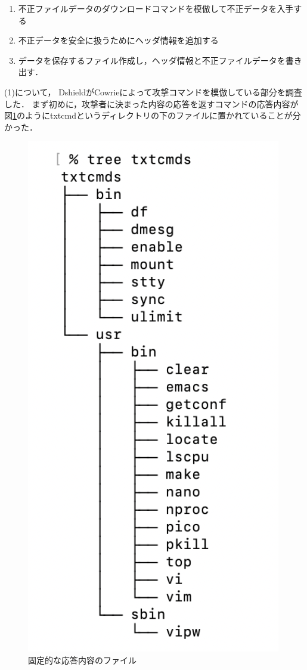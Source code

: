 \documentclass[dvipdfmx]{bta}
\begin{document}
\renewcommand{\labelenumi}{(\arabic{enumi})}
\begin{enumerate}
	\item 不正ファイルデータのダウンロードコマンドを模倣して不正データを入手する
	\item 不正データを安全に扱うためにヘッダ情報を追加する
	\item データを保存するファイル作成し，ヘッダ情報と不正ファイルデータを書き出す．
\end{enumerate}

(1)について，
DshieldがCowrieによって攻撃コマンドを模倣している部分を調査した．
まず初めに，攻撃者に決まった内容の応答を返すコマンドの応答内容が図\ref{fig:textcmds}のようにtxtcmdというディレクトリの下のファイルに置かれていることが分かった．

\begin{figure}[htbp]
	\centering
 	\includegraphics[scale=0.7]{txtcmds.png}
 	\caption{固定的な応答内容のファイル}\label{fig:textcmds}
\end{figure}
\end{document}
